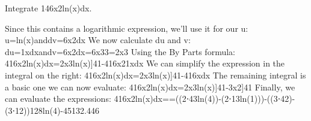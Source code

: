 \begin{example}
Integrate \int 146x2ln(x)dx.

\begin{solution}
Since this contains a logarithmic expression, we'll use it for our u:
u=ln(x)anddv=6x2dx
We now calculate du and v:
du=1xdxandv=\int 6x2dx=6x33=2x3
Using the By Parts formula:
\int 416x2ln(x)dx=2x3ln(x)]41-\int 416x21xdx
We can simplify the expression in the integral on the right:
\int 416x2ln(x)dx=2x3ln(x)]41-\int 416xdx
The remaining integral is a basic one we can now evaluate:
\int 416x2ln(x)dx=2x3ln(x)]41-3x2]41
Finally, we can evaluate the expressions:
\int 416x2ln(x)dx==\approx   ((2⋅43ln(4))-(2⋅13ln(1)))-((3⋅42)-(3⋅12))128ln(4)-45132.446
\end{solution}\end{example}
